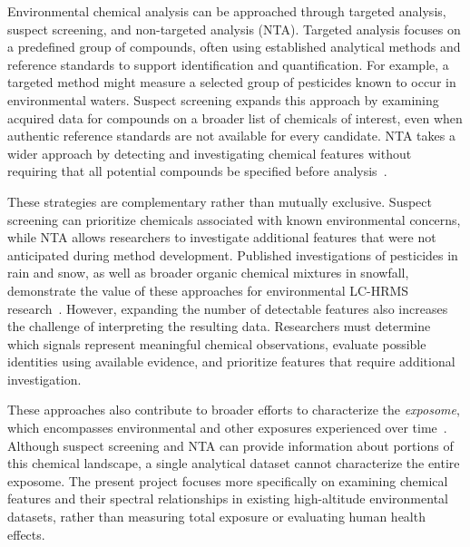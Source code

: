 
        Environmental chemical analysis can be approached through targeted analysis, suspect screening, and non-targeted analysis (NTA). Targeted analysis focuses on a predefined group of compounds, often using established analytical methods and reference standards to support identification and quantification. For example, a targeted method might measure a selected group of pesticides known to occur in environmental waters. Suspect screening expands this approach by examining acquired data for compounds on a broader list of chemicals of interest, even when authentic reference standards are not available for every candidate. NTA takes a wider approach by detecting and investigating chemical features without requiring that all potential compounds be specified before analysis~\cite{Manz2023,Schulze2020}.

        These strategies are complementary rather than mutually exclusive. Suspect screening can prioritize chemicals associated with known environmental concerns, while NTA allows researchers to investigate additional features that were not anticipated during method development. Published investigations of pesticides in rain and snow, as well as broader organic chemical mixtures in snowfall, demonstrate the value of these approaches for environmental LC-HRMS research~\cite{Gray2022,NinoSuastegui2025}. However, expanding the number of detectable features also increases the challenge of interpreting the resulting data. Researchers must determine which signals represent meaningful chemical observations, evaluate possible identities using available evidence, and prioritize features that require additional investigation.

        These approaches also contribute to broader efforts to characterize the \emph{exposome}, which encompasses environmental and other exposures experienced over time~\cite{Manz2023}. Although suspect screening and NTA can provide information about portions of this chemical landscape, a single analytical dataset cannot characterize the entire exposome. The present project focuses more specifically on examining chemical features and their spectral relationships in existing high-altitude environmental datasets, rather than measuring total exposure or evaluating human health effects.

